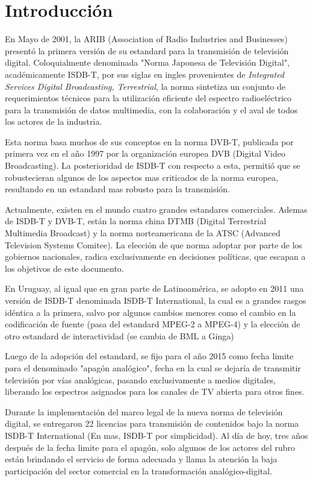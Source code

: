 \chapter{Introducción}

En Mayo de 2001, la ARIB (Association of Radio Industries and Businesses)\cite{ARIB} presentó la primera versión de su estandard para la transmisión de televisión digital. Coloquialmente denominada "Norma Japonesa de Televisión Digital", académicamente ISDB-T, por sus siglas en ingles provenientes de \textit{Integrated Services Digital Broadcasting, Terrestrial}, la norma sintetiza un conjunto de requerimientos técnicos para la utilización eficiente del espectro radioeléctrico para la transmisión de datos multimedia, con la colaboración y el aval de todos los actores de la industria.

Esta norma basa muchos de sus conceptos en la norma DVB-T, publicada por primera vez en el año 1997 por la organización europea DVB (Digital Video Broadcasting). La posterioridad de ISDB-T con respecto a esta, permitió que se robustecieran algunos de los aspectos mas criticados de la norma europea, resultando en un estandard mas robusto para la transmisión.

Actualmente, existen en el mundo cuatro grandes estandares comerciales. Ademas de ISDB-T y DVB-T, están la norma china DTMB (Digital Terrestrial Multimedia Broadcast) y la norma norteamericana de la ATSC (Advanced Television Systems Comitee). La elección de que norma adoptar por parte de los gobiernos nacionales, radica exclusivamente en decisiones políticas, que escapan a los objetivos de este documento.

En Uruguay, al igual que en gran parte de Latinoamérica, se adopto en 2011 una versión de ISDB-T denominada ISDB-T International, la cual es a grandes rasgos idéntica a la primera, salvo por algunos cambios menores como el cambio en la codificación de fuente (pasa del estandard MPEG-2 a MPEG-4) y la elección de otro estandard de interactividad (se cambia de BML a Ginga)

Luego de la adopción del estandard, se fijo para el año 2015 como fecha limite para el denominado "apagón analógico", fecha en la cual se dejaría de transmitir televisión por vías analógicas, pasando exclusivamente a medios digitales, liberando los espectros asignados para los canales de TV abierta para otros fines. 

Durante la implementación del marco legal de la nueva norma de televisión digital, se entregaron 22 licencias para transmisión de contenidos bajo la norma ISDB-T International (En mas, ISDB-T por simplicidad). Al día de hoy, tres años después de la fecha limite para el apagón, solo algunos de los actores del rubro están brindando el servicio de forma adecuada y llama la atención la baja participación del sector comercial en la transformación analógico-digital. 

